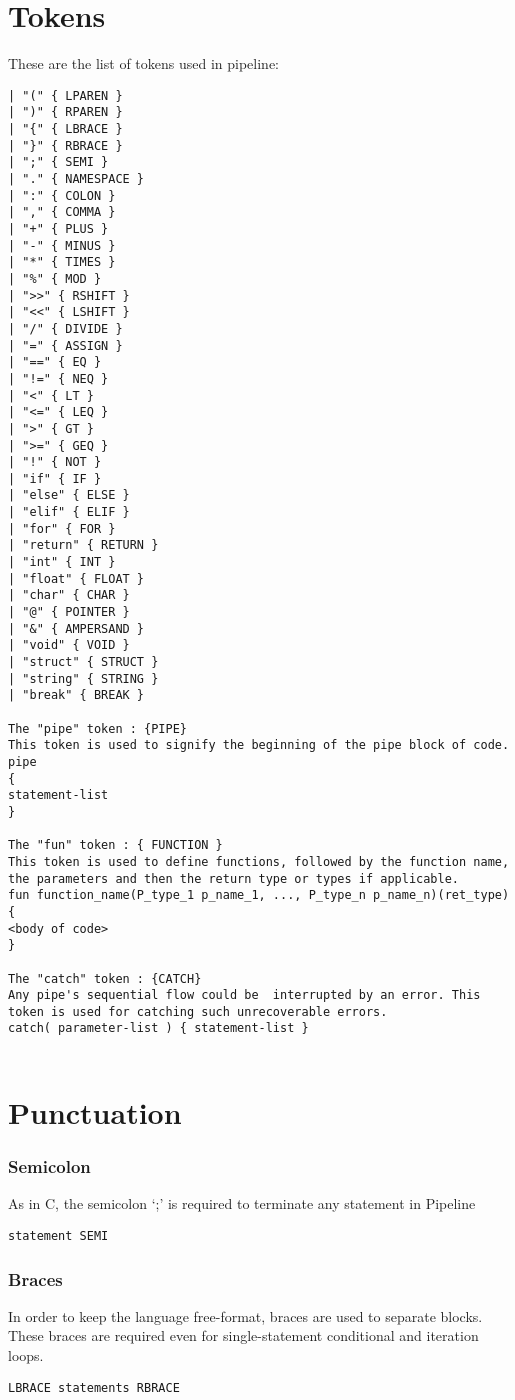 \documentclass[./LRM_main.tex]{subfiles}
\begin{document}
\section{Tokens}
These are the list of tokens used in pipeline:\\
\begin{lstlisting}
| "(" { LPAREN } 
| ")" { RPAREN } 
| "{" { LBRACE } 
| "}" { RBRACE } 
| ";" { SEMI } 
| "." { NAMESPACE }
| ":" { COLON } 
| "," { COMMA } 
| "+" { PLUS } 
| "-" { MINUS }
| "*" { TIMES } 
| "%" { MOD } 
| ">>" { RSHIFT } 
| "<<" { LSHIFT } 
| "/" { DIVIDE } 
| "=" { ASSIGN } 
| "==" { EQ }
| "!=" { NEQ } 
| "<" { LT } 
| "<=" { LEQ } 
| ">" { GT } 
| ">=" { GEQ } 
| "!" { NOT } 
| "if" { IF } 
| "else" { ELSE } 
| "elif" { ELIF } 
| "for" { FOR } 
| "return" { RETURN } 
| "int" { INT }
| "float" { FLOAT } 
| "char" { CHAR }
| "@" { POINTER } 
| "&" { AMPERSAND } 
| "void" { VOID } 
| "struct" { STRUCT } 
| "string" { STRING } 
| "break" { BREAK } 

The "pipe" token : {PIPE}
This token is used to signify the beginning of the pipe block of code. 
pipe
{
statement-list
} 

The "fun" token : { FUNCTION } 
This token is used to define functions, followed by the function name, the parameters and then the return type or types if applicable.
fun function_name(P_type_1 p_name_1, ..., P_type_n p_name_n)(ret_type)
{
<body of code>
}

The "catch" token : {CATCH}
Any pipe's sequential flow could be  interrupted by an error. This token is used for catching such unrecoverable errors.
catch( parameter-list ) { statement-list }


\end{lstlisting}


\section{Punctuation}
\subsubsection{Semicolon}
As in C, the semicolon ‘;’ is required to terminate any statement in Pipeline
\begin{lstlisting}
statement SEMI
\end{lstlisting}

\subsubsection{Braces}
In order to keep the language free-format, braces are used to separate blocks. These braces are required even for single-statement conditional and iteration loops. 
\begin{lstlisting}
LBRACE statements RBRACE
\end{lstlisting}
\end{document}

